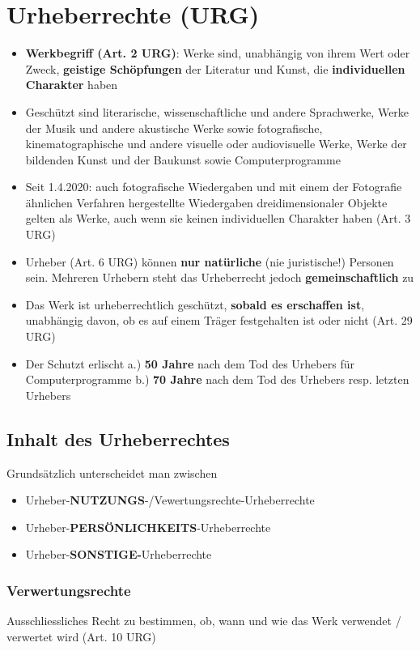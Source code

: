 \documentclass{report}
\theoremstyle{definition}
\theoremstyle{example}
\begin{document}
\section{Urheberrechte (URG)}
\begin{itemize}
   \item \textbf{Werkbegriff (Art. 2 URG)}: Werke sind, unabhängig von ihrem Wert oder Zweck, \textbf{geistige Schöpfungen} der Literatur und Kunst, die \textbf{individuellen Charakter} haben
   \item Geschützt sind literarische, wissenschaftliche und andere Sprachwerke, Werke der Musik und andere akustische Werke sowie fotografische, kinematographische und andere visuelle oder audiovisuelle Werke, Werke der bildenden Kunst und der Baukunst sowie Computerprogramme
   \item Seit 1.4.2020: auch fotografische Wiedergaben und mit einem der Fotografie ähnlichen Verfahren hergestellte Wiedergaben dreidimensionaler Objekte gelten als Werke, auch wenn sie keinen individuellen Charakter haben (Art. 3 URG)
   \item Urheber (Art. 6 URG) können \textbf{nur natürliche} (nie juristische!) Personen sein. Mehreren Urhebern steht das Urheberrecht jedoch \textbf{gemeinschaftlich} zu
   \item Das Werk ist urheberrechtlich geschützt, \textbf{sobald es erschaffen ist}, unabhängig davon, ob es auf einem Träger festgehalten ist oder nicht (Art. 29 URG)
   \item Der Schutzt erlischt
   \subitem a.) \textbf{50 Jahre} nach dem Tod des Urhebers für Computerprogramme
   \subitem b.) \textbf{70 Jahre} nach dem Tod des Urhebers resp. letzten Urhebers 
\end{itemize}

\subsection{Inhalt des Urheberrechtes}
Grundsätzlich unterscheidet man zwischen
\begin{itemize}
   \item Urheber-\textbf{NUTZUNGS}-/Vewertungsrechte-Urheberrechte
   \item Urheber-\textbf{PERSÖNLICHKEITS}-Urheberrechte
   \item Urheber-\textbf{SONSTIGE-}Urheberrechte
\end{itemize}
\subsubsection{Verwertungsrechte}
Ausschliessliches Recht zu bestimmen, ob, wann und wie das Werk verwendet / verwertet wird (Art. 10 URG)
\end{document}
